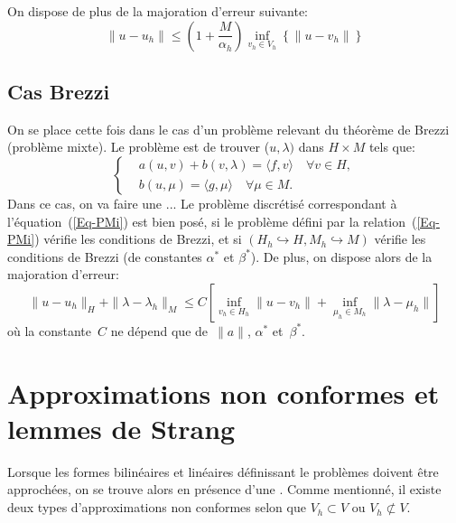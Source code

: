 \medskip
On dispose de plus de la majoration d'erreur suivante:
\begin{equation}
\|u-u_h\| \le \left(1+\dfrac{M}{\alpha_h}\right) \inf_{v_h\in V_h} \left\{\|u-v_h\|\right\}
\end{equation}

\medskip
\subsection{Cas Brezzi}
On se place cette fois dans le cas d'un problème relevant du théorème de Brezzi
(problème mixte).
Le problème est de trouver ($u, \lambda)$ dans $H\times M$ tels que:
 \begin{equation}\label{Eq-PMi}
\left\{
\begin{aligned}
 &a(u,v) + b(v, \lambda) = \langle f,v\rangle \quad \forall v\in H,\\
&b(u,\mu) = \langle g,\mu\rangle \quad \forall \mu \in M.
\end{aligned}\right.
\end{equation}
\medskipvm
Dans ce cas, on va faire une ...
Le problème discrétisé correspondant à l'équation~(\ref{Eq-PMi}) est bien posé, si le problème défini par la relation~(\ref{Eq-PMi}) vérifie les conditions de Brezzi, et si $(H_h\hookrightarrow H, M_h\hookrightarrow M)$ vérifie les conditions de Brezzi (de constantes $\alpha^*$ et $\beta^*$).
De plus, on dispose alors de la majoration d'erreur:
\begin{equation}
\|u-u_h\|_H + \|\lambda-\lambda_h\|_M \le C\left[
\inf_{v_h\in H_h} \|u-v_h\|
+ \inf_{\mu_h\in M_h} \|\lambda-\mu_h\|
\right]
\end{equation}
où la constante~$C$ ne dépend que de~$\|a\|$, $\alpha^*$ et~$\beta^*$.


\medskip
\section{Approximations non conformes et lemmes de Strang}\label{Sec-Strang}

Lorsque les formes bilinéaires et linéaires définissant le problèmes doivent être approchées, on se trouve alors en présence d'une . Comme mentionné, il existe deux types d'approximations non conformes selon que
$V_h\subset V$ ou $V_h\not\subset V$.

